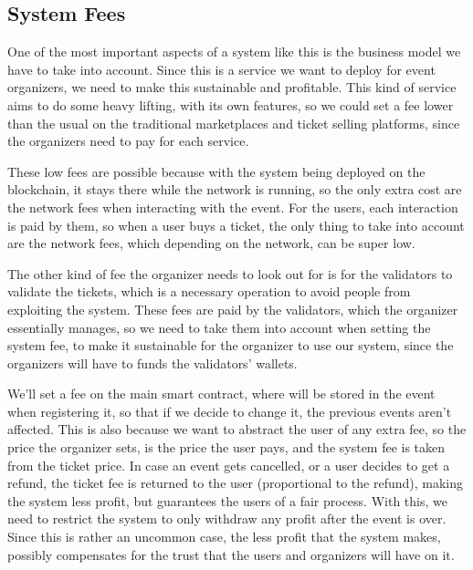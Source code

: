 \subsection{System Fees}
\label{subsec:system_fees}

One of the most important aspects of a system like this is the business model
we have to take into account. Since this is a service we want to deploy for
event organizers, we need to make this sustainable and profitable. This kind of
service aims to do some heavy lifting, with its own features, so we could set a
fee lower than the usual on the traditional marketplaces and ticket selling
platforms, since the organizers need to pay for each service.

These low fees are possible because with the system being deployed on the
blockchain, it stays there while the network is running, so the only extra cost
are the network fees when interacting with the event. For the users, each
interaction is paid by them, so when a user buys a ticket, the only thing to
take into account are the network fees, which depending on the network, can be
super low.

The other kind of fee the organizer needs to look out for is for the validators
to validate the tickets, which is a necessary operation to avoid people from
exploiting the system. These fees are paid by the validators, which the
organizer essentially manages, so we need to take them into account when
setting the system fee, to make it sustainable for the organizer to use our
system, since the organizers will have to funds the validators' wallets.

We'll set a fee on the main smart contract, where will be stored in the event
when registering it, so that if we decide to change it, the previous events
aren't affected. This is also because we want to abstract the user of any extra
fee, so the price the organizer sets, is the price the user pays, and the
system fee is taken from the ticket price. In case an event gets cancelled, or
a user decides to get a refund, the ticket fee is returned to the user
(proportional to the refund), making the system less profit, but guarantees the
users of a fair process. With this, we need to restrict the system to only
withdraw any profit after the event is over. Since this is rather an uncommon
case, the less profit that the system makes, possibly compensates for the trust
that the users and organizers will have on it.
